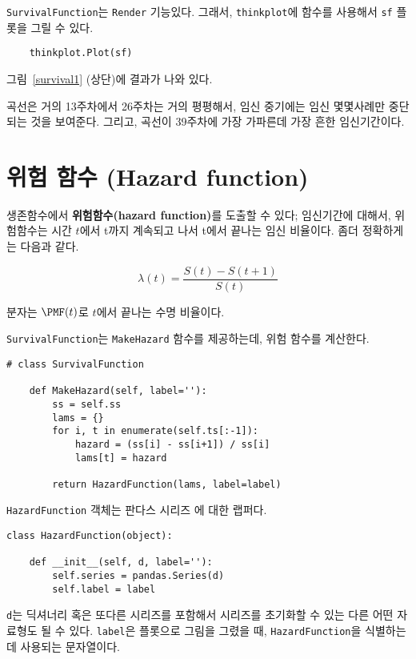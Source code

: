 {\tt SurvivalFunction}는 {\tt Render} 기능있다. 그래서,
{\tt thinkplot}에 함수를 사용해서 {\tt sf} 플롯을 그릴 수 있다.

\begin{verbatim}
    thinkplot.Plot(sf)
\end{verbatim}

그림~\ref{survival1} (상단)에 결과가 나와 있다.

곡선은 거의 13주차에서 26주차는 거의 평평해서, 임신 중기에는 임신 몇몇사례만 중단되는 것을 보여준다. 그리고, 곡선이 39주차에 가장 가파른데 가장 흔한 임신기간이다.


\section{위험 함수 (Hazard function)}
\label{hazard}

생존함수에서 {\bf 위험함수(hazard function)}를 도출할 수 있다; 임신기간에 대해서, 위험함수는 시간 $t$에서 t까지 계속되고 나서 t에서 끝나는 임신 비율이다. 좀더 정확하게는 다음과 같다.

%
\[ \lambda(t) = \frac{S(t) - S(t+1)}{S(t)} \]
%

분자는 $\PMF(t)$로 $t$에서 끝나는 수명 비율이다.

{\tt SurvivalFunction}는 {\tt MakeHazard} 함수를 제공하는데, 위험 함수를 계산한다.

\begin{verbatim}
# class SurvivalFunction

    def MakeHazard(self, label=''):
        ss = self.ss
        lams = {}
        for i, t in enumerate(self.ts[:-1]):
            hazard = (ss[i] - ss[i+1]) / ss[i]
            lams[t] = hazard

        return HazardFunction(lams, label=label)
\end{verbatim}

{\tt HazardFunction} 객체는 판다스 시리즈 에 대한 랩퍼다. 

\begin{verbatim}
class HazardFunction(object):

    def __init__(self, d, label=''):
        self.series = pandas.Series(d)
        self.label = label
\end{verbatim}

{\tt d}는 딕셔너리 혹은 또다른 시리즈를 포함해서 시리즈를 초기화할 수 있는 다른 어떤 자료형도 될 수 있다. {\tt label}은 플롯으로 그림을 그렸을 때, {\tt HazardFunction}을 식별하는데 사용되는 문자열이다.

